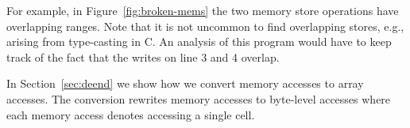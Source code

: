 For example, in Figure~\ref{fig:broken-mems} the two memory store
operations have overlapping ranges.  Note that it is not uncommon to
find overlapping stores, e.g., arising from type-casting in C.  An
analysis of this program would have to keep track of the fact that the
writes on line 3 and 4 overlap.


In Section~\ref{sec:deend} we show how we convert memory accesses to
array accesses.  The conversion rewrites memory accesses to byte-level
accesses where each memory access denotes accessing a single cell.





